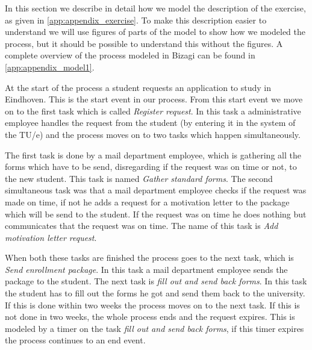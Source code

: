 
In this section we describe in detail how we model the description of the exercise, as given in \autoref{app:appendix_exercise}.
To make this description easier to understand we will use figures of parts of the model to show how we modeled the process, but it should be possible to understand this without the figures.
A complete overview of the process modeled in Bizagi can be found in \autoref{app:appendix_model1}.

At the start of the process a student requests an application to study in Eindhoven.
This is the start event in our process.
From this start event we move on to the first task which is called \emph{Register request}.
In this task a administrative employee handles the request from the student (by entering it in the system of the TU/e) and the process moves on to two tasks which happen simultaneously.

The first task is done by a mail department employee, which is gathering all the forms which have to be send, disregarding if the request was on time or not, to the new student.
This task is named \emph{Gather standard forms}.
The second simultaneous task was that a mail department employee checks if the request was made on time, if not he adds a request for a motivation letter to the package which will be send to the student.
If the request was on time he does nothing but communicates that the request was on time.
The name of this task is \emph{Add motivation letter request}.

When both these tasks are finished the process goes to the next task, which is \emph{Send enrollment package}.
In this task a mail department employee sends the package to the student.
The next task is \emph{fill out and send back forms}.
In this task the student has to fill out the forms he got and send them back to the university.
If this is done within two weeks the process moves on to the next task.
If this is not done in two weeks, the whole process ends and the request expires.
This is modeled by a timer on the task \emph{fill out and send back forms}, if this timer expires the process continues to an end event.

